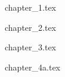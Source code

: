 \documentclass[10pt]{extarticle}
\begin{document}
  \begin{multicols}{2}

    {chapter_1.tex}
    \newpage

    {chapter_2.tex}
    \newpage

    {chapter_3.tex}
    \newpage

    {chapter_4a.tex}
    \newpage

    \newpage

    \newpage

    \newpage

    \newpage

    \newpage


  \end{multicols}
\end{document}
